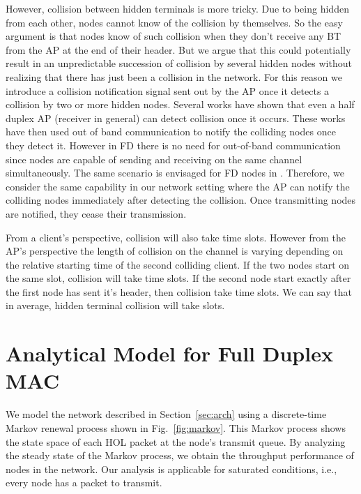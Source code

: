 \documentclass[10pt,journal,cspaper,compsoc]{IEEEtran}
\begin{document}
However, collision between hidden terminals is more tricky. Due to being hidden from each other, nodes cannot know of the collision by themselves. So the easy argument is that nodes know of such collision when they don't receive any BT from the AP at the end of their header. But we argue that this could potentially result in an unpredictable succession of collision by several hidden nodes without realizing that there has just been a collision in the network. For this reason we introduce a collision notification signal sent out by the AP once it detects a collision by two or more hidden nodes. Several works \cite{Sen09,Sen10} have shown that even a half duplex AP (receiver in general) can detect collision once it occurs. These works have then used out of band communication to notify the colliding nodes once they detect it. However in FD there is no need for out-of-band communication since nodes are capable of sending and receiving on the same channel simultaneously. The same scenario is  envisaged for FD nodes in \cite{Srinivasan12}. Therefore, we consider the same capability in our network setting where the AP can notify the colliding nodes immediately after detecting the collision. Once transmitting nodes are notified, they cease their transmission.

From a client's perspective, collision will also take  time slots. However from the AP's perspective the length of collision on the channel is varying depending on the relative starting time of the second colliding client. If the two nodes start on the same slot, collision will take  time slots. If the second node start exactly after the first node has sent it's header, then collision take  time slots. We can say that in average, hidden terminal collision will take  slots. 

\section{Analytical Model for Full Duplex MAC}
\label{sec:model}

We model the network described in Section~\ref{sec:arch} using a discrete-time Markov renewal process  shown in Fig.~\ref{fig:markov}. This Markov process shows the state space of each HOL packet at the node's transmit queue. By analyzing the steady state of the Markov process, we obtain the throughput performance of nodes in the network. Our analysis is applicable for saturated conditions, i.e., every node has a packet to transmit.  
\end{document}
